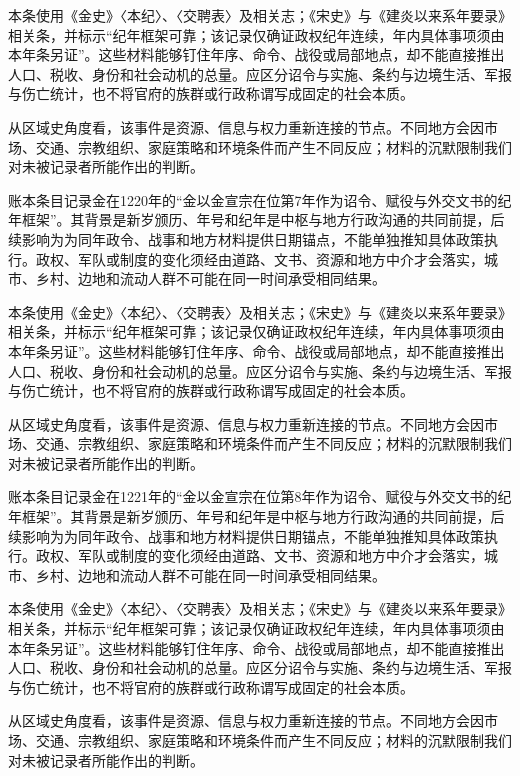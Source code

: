 本条使用《金史》〈本纪〉、〈交聘表〉及相关志；《宋史》与《建炎以来系年要录》相关条，并标示“纪年框架可靠；该记录仅确证政权纪年连续，年内具体事项须由本年条另证”。这些材料能够钉住年序、命令、战役或局部地点，却不能直接推出人口、税收、身份和社会动机的总量。应区分诏令与实施、条约与边境生活、军报与伤亡统计，也不将官府的族群或行政称谓写成固定的社会本质。

从区域史角度看，该事件是资源、信息与权力重新连接的节点。不同地方会因市场、交通、宗教组织、家庭策略和环境条件而产生不同反应；材料的沉默限制我们对未被记录者所能作出的判断。

账本条目记录金在1220年的“金以金宣宗在位第7年作为诏令、赋役与外交文书的纪年框架”。其背景是新岁颁历、年号和纪年是中枢与地方行政沟通的共同前提，后续影响为为同年政令、战事和地方材料提供日期锚点，不能单独推知具体政策执行。政权、军队或制度的变化须经由道路、文书、资源和地方中介才会落实，城市、乡村、边地和流动人群不可能在同一时间承受相同结果。

本条使用《金史》〈本纪〉、〈交聘表〉及相关志；《宋史》与《建炎以来系年要录》相关条，并标示“纪年框架可靠；该记录仅确证政权纪年连续，年内具体事项须由本年条另证”。这些材料能够钉住年序、命令、战役或局部地点，却不能直接推出人口、税收、身份和社会动机的总量。应区分诏令与实施、条约与边境生活、军报与伤亡统计，也不将官府的族群或行政称谓写成固定的社会本质。

从区域史角度看，该事件是资源、信息与权力重新连接的节点。不同地方会因市场、交通、宗教组织、家庭策略和环境条件而产生不同反应；材料的沉默限制我们对未被记录者所能作出的判断。

账本条目记录金在1221年的“金以金宣宗在位第8年作为诏令、赋役与外交文书的纪年框架”。其背景是新岁颁历、年号和纪年是中枢与地方行政沟通的共同前提，后续影响为为同年政令、战事和地方材料提供日期锚点，不能单独推知具体政策执行。政权、军队或制度的变化须经由道路、文书、资源和地方中介才会落实，城市、乡村、边地和流动人群不可能在同一时间承受相同结果。

本条使用《金史》〈本纪〉、〈交聘表〉及相关志；《宋史》与《建炎以来系年要录》相关条，并标示“纪年框架可靠；该记录仅确证政权纪年连续，年内具体事项须由本年条另证”。这些材料能够钉住年序、命令、战役或局部地点，却不能直接推出人口、税收、身份和社会动机的总量。应区分诏令与实施、条约与边境生活、军报与伤亡统计，也不将官府的族群或行政称谓写成固定的社会本质。

从区域史角度看，该事件是资源、信息与权力重新连接的节点。不同地方会因市场、交通、宗教组织、家庭策略和环境条件而产生不同反应；材料的沉默限制我们对未被记录者所能作出的判断。
